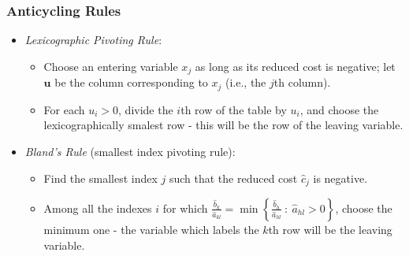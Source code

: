 \documentclass{beamer}
\theoremstyle{plain}
\newcommand{\git}[1]{\textcolor{grena}{\it #1}}
\def\uu{{\mathbf u}}
\begin{document}
\begin{frame}\frametitle{Anticycling Rules}
\justifying

\begin{itemize}
\justifying

\item \git{Lexicographic Pivoting Rule}:

\begin{itemize}
\justifying

\item Choose an entering variable $ x_j $ as long as its reduced cost is negative; let $ \uu $ be the column corresponding to $ x_j $ (i.e., the $ j $th column).

\item For each $ u_i > 0 $, divide the $ i $th row of the table by $ u_i $, and choose the lexicographically smalest row - this will be the row of the leaving variable.

\end{itemize}

\item \git{Bland's Rule} (smallest index pivoting rule):

\begin{itemize}
\justifying

\item Find the smallest index $ j $ such that the reduced cost $ \widehat{c}_j $ is negative.

\item Among all the indexes $ i $ for which $ \displaystyle \frac{\widehat{b}_k}{\widehat{a}_{kl}}  = \min{\left\{ \frac{\widehat{b}_h}{\widehat{a}_{hl}} \: : \: \widehat{a}_{hl} > 0 \right\}} $, choose the minimum one - the variable which labels the $ k $th row will be the leaving variable.
\end{itemize}

\end{itemize}

\end{frame}
\end{document}
